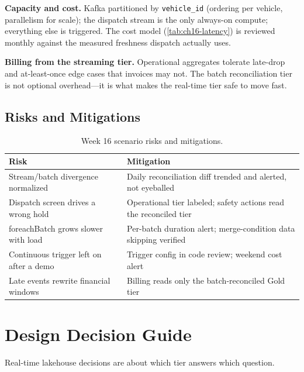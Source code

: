 \textbf{Capacity and cost.} Kafka partitioned by \texttt{vehicle\_id} (ordering per vehicle, parallelism for scale); the dispatch stream is the only always-on compute; everything else is triggered. The cost model (\cref{tab:ch16-latency}) is reviewed monthly against the measured freshness dispatch actually uses.

\begin{pitfall}
\textbf{Billing from the streaming tier.} Operational aggregates tolerate late-drop and at-least-once edge cases that invoices may not. The batch reconciliation tier is not optional overhead---it is what makes the real-time tier safe to move fast.
\end{pitfall}

\subsection{Risks and Mitigations}
\begin{table}[H]
\centering
\small
\begin{tabular}{@{}p{4.6cm}p{7.6cm}@{}}
\toprule
\textbf{Risk} & \textbf{Mitigation} \\
\midrule
Stream/batch divergence normalized & Daily reconciliation diff trended and alerted, not eyeballed \\
Dispatch screen drives a wrong hold & Operational tier labeled; safety actions read the reconciled tier \\
foreachBatch grows slower with load & Per-batch duration alert; merge-condition data skipping verified \\
Continuous trigger left on after a demo & Trigger config in code review; weekend cost alert \\
Late events rewrite financial windows & Billing reads only the batch-reconciled Gold tier \\
\bottomrule
\end{tabular}
\caption{Week 16 scenario risks and mitigations.}
\label{tab:ch16-risks}
\end{table}

\section{Design Decision Guide}
%
Real-time lakehouse decisions are about which tier answers which question.

